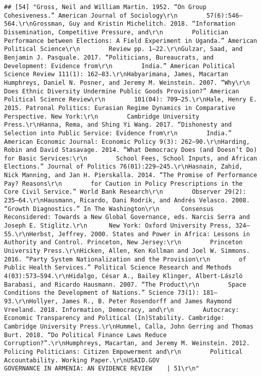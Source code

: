 \documentclass[
]{article}
\begin{document}
\begin{verbatim}
## [54] "Gross, Neil and William Martin. 1952. “On Group Cohesiveness.” American Journal of Sociology\r\n        57(6):546–564.\r\nGrossman, Guy and Kristin Michelitch. 2018. “Information Dissemination, Competitive Pressure, and\r\n        Politician Performance between Elections: A Field Experiment in Uganda.” American Political Science\r\n        Review pp. 1–22.\r\nGulzar, Saad, and Benjamin J. Pasquale. 2017. “Politicians, Bureaucrats, and Development: Evidence from\r\n        India.” American Political Science Review 111(1): 162–83.\r\nHabyarimana, James, Macartan Humphreys, Daniel N. Posner, and Jeremy M. Weinstein. 2007. “Why\r\n        Does Ethnic Diversity Undermine Public Goods Provision?” American Political Science Review\r\n        101(04): 709–25.\r\nHale, Henry E. 2015. Patronal Politics: Eurasian Regime Dynamics in Comparative Perspective. New York:\r\n        Cambridge University Press.\r\nHanna, Rema, and Shing Yi Wang. 2017. “Dishonesty and Selection into Public Service: Evidence from\r\n        India.” American Economic Journal: Economic Policy 9(3): 262–90.\r\nHarding, Robin and David Stasavage. 2014. “What Democracy Does (and Doesn’t Do) for Basic Services:\r\n        School Fees, School Inputs, and African Elections.” Journal of Politics 76(01):229–245.\r\nHasnain, Zahid, Nick Manning, and Jan H. Pierskalla. 2014. “The Promise of Performance Pay? Reasons\r\n        for Caution in Policy Prescriptions in the Core Civil Service.” World Bank Research\r\n        Observer 29(2): 235–64.\r\nHausmann, Ricardo, Dani Rodrik, and Andrés Velasco. 2008. “Growth Diagnostics.” In The Washington\r\n      Consensus Reconsidered: Towards a New Global Governance, eds. Narcis Serra and Joseph E. Stiglitz.\r\n      New York: Oxford University Press, 324–55.\r\nHerbst, Jeffrey. 2000. States and Power in Africa: Lessons in Authority and Control. Princeton, New Jersey:\r\n        Princeton University Press.\r\nHicken, Allen, Ken Kollman and Joel W. Simmons. 2016. “Party System Nationalization and the Provision\r\n        of Public Health Services.” Political Science Research and Methods 4(03):573–594.\r\nHidalgo, César A., Bailey Klinger, Albert-László Barabasi, and Ricardo Hausmann. 2007. “The Product\r\n        Space Conditions the Development of Nations.” Science 73(1): 181–93.\r\nHollyer, James R., B. Peter Rosendorff and James Raymond Vreeland. 2018. Information, Democracy, and\r\n        Autocracy: Economic Transparency and Political (In)Stability. Cambridge: Cambridge University Press.\r\nHummel, Calla, John Gerring and Thomas Burt. 2018. “Do Political Finance Laws Reduce Corruption?”.\r\nHumphreys, Macartan, and Jeremy M. Weinstein. 2012. Policing Politicians: Citizen Empowerment and\r\n        Political Accountability. Working Paper.\r\nUSAID.GOV                                                     GOVERNANCE IN ARMENIA: AN EVIDENCE REVIEW    | 51\r\n"                                                                                                                                                                                                                                                                                                                                                                                                                        
\end{verbatim}
\end{document}
